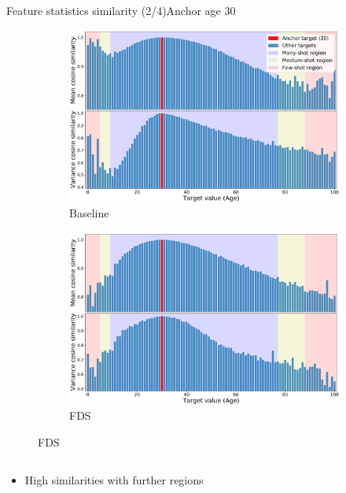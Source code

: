 \begin{frame}{Feature statistics similarity (2/4)}{Anchor age 30}
	\begin{figure}[h]
		\begin{subfigure}{0.48\textwidth}
			\includegraphics[width=\linewidth]{images/feat_sim_fds_base_30.pdf}
			\caption{Baseline}
		\end{subfigure}\hspace{1em}%
		\begin{subfigure}{0.48\textwidth}
			\includegraphics[width=\linewidth]{images/feat_sim_fds_ours_30.pdf}
			\caption{FDS}
		\end{subfigure}
	\end{figure}
	\vspace{-1em}
	\begin{columns}
		\footnotesize
		\begin{column}{0.5\textwidth}
			\begin{itemize}
				\item High similarities with further regions

\end{itemize}
\end{column}
\end{columns}
\end{frame}
